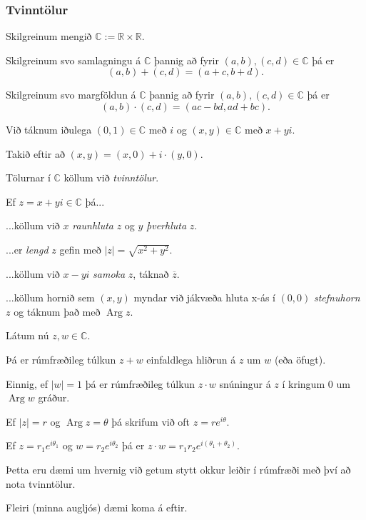 {
	\frametitle{Tvinntölur}
	{
		\item<1-> Skilgreinum mengið $\mathbb{C} := \mathbb{R} \times \mathbb{R}$.
		\item<2-> Skilgreinum svo samlagningu á $\mathbb{C}$ þannig að fyrir $(a, b), (c, d) \in \mathbb{C}$ þá er
			\[
				(a, b) + (c, d) = (a + c, b + d).
			\]
		\item<3-> Skilgreinum svo margföldun á $\mathbb{C}$ þannig að fyrir $(a, b), (c, d) \in \mathbb{C}$ þá er
			\[
				(a, b) \cdot (c, d) = (ac - bd, ad + bc).
			\]
		\item<4-> Við táknum iðulega $(0, 1) \in \mathbb{C}$ með $i$ og $(x, y) \in \mathbb{C}$ með $x + yi$.
		\item<5-> Takið eftir að $(x, y) = (x, 0) + i \cdot (y, 0)$.
		\item<6-> Tölurnar í $\mathbb{C}$ köllum við \emph{tvinntölur}.
	}
}

{
	{
		\item<1-> Ef $z = x + yi \in \mathbb{C}$ þá...
		{
			\item<2-> ...köllum við $x$ \emph{raunhluta} $z$ og $y$ \emph{þverhluta} $z$.
			\item<3-> ...er \emph{lengd} $z$ gefin með $|z| = \sqrt{x^2 + y^2}$.
			\item<4-> ...köllum við $x - yi$ \emph{samoka} $z$, táknað $\overline{z}$.
			\item<5-> ...köllum hornið sem $(x, y)$ myndar við jákvæða hluta x-ás í $(0, 0)$ \emph{stefnuhorn} $z$
				og táknum það með $\operatorname{Arg} z$.
		}
	}
}

{
	{
		\item<1-> Látum nú $z, w \in \mathbb{C}$.
		\item<2-> Þá er rúmfræðileg túlkun $z + w$ einfaldlega hliðrun á $z$ um $w$ (eða öfugt).
		\item<3-> Einnig, ef $|w| = 1$ þá er rúmfræðileg túlkun $z \cdot w$ snúningur á $z$ í kringum $0$ um $\operatorname{Arg} w$ gráður.
		\item<4-> Ef $|z| = r$ og $\operatorname{Arg} z = \theta$ þá skrifum við oft $z = re^{i\theta}$.
		\item<5-> Ef $z = r_1e^{i\theta_1}$ og $w = r_2e^{i\theta_2}$ þá er $z \cdot w = r_1r_2e^{i(\theta_1 + \theta_2)}$.
		\item<6-> Þetta eru dæmi um hvernig við getum stytt okkur leiðir í rúmfræði með því að nota tvinntölur.
		\item<7-> Fleiri (minna augljós) dæmi koma á eftir.
	}
}

